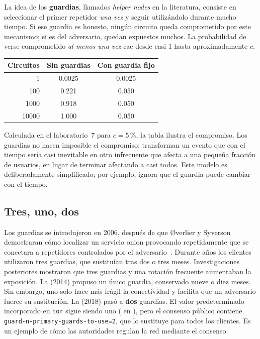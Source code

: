 La idea de los \textbf{guardias}, llamados \emph{helper nodes} en la literatura, consiste en seleccionar el primer repetidor \emph{una vez} y seguir utilizándolo durante mucho tiempo. Si ese guardia es honesto, ningún circuito queda comprometido por este mecanismo; si es del adversario, quedan expuestos muchos. La probabilidad de verse comprometido \emph{al menos una vez} cae desde casi 1 hasta aproximadamente $c$.

\begin{center}
\begin{tabular}{rcc}
\toprule
Circuitos & Sin guardias & Con guardia fijo \\
\midrule
1 & 0.0025 & 0.0025 \\
100 & 0.221 & 0.050 \\
\num{1000} & 0.918 & 0.050 \\
\num{10000} & 1.000 & 0.050 \\
\bottomrule
\end{tabular}
\end{center}

\noindent Calculada en el laboratorio~7 para $c=5\,\%$, la tabla ilustra el compromiso. Los guardias no hacen imposible el compromiso: transforman un evento que con el tiempo sería casi inevitable en otro infrecuente que afecta a una pequeña fracción de usuarios, en lugar de terminar afectando a casi todos. Este modelo es deliberadamente simplificado; por ejemplo, ignora que el guardia puede cambiar con el tiempo.

\subsection{Tres, uno, dos}

Los guardias se introdujeron en 2006, después de que Øverlier y Syverson demostraran cómo localizar un servicio onion provocando repetidamente que se conectara a repetidores controlados por el adversario~\cite{overlier2006locating}. Durante años los clientes utilizaron tres guardias, que sustituían tras dos o tres meses. Investigaciones posteriores mostraron que tres guardias y una rotación frecuente aumentaban la exposición. La  (2014) propuso un único guardia, conservado nueve o diez meses. Sin embargo, uno solo hace más frágil la conectividad y facilita que un adversario fuerce su sustitución. La  (2018) pasó a \textbf{dos} guardias. El valor predeterminado incorporado en \texttt{tor} sigue siendo uno ( en ), pero el consenso público contiene \texttt{guard-n-primary-guards-to-use=2}, que lo sustituye para todos los clientes. Es un ejemplo de cómo las autoridades regulan la red mediante el consenso.

